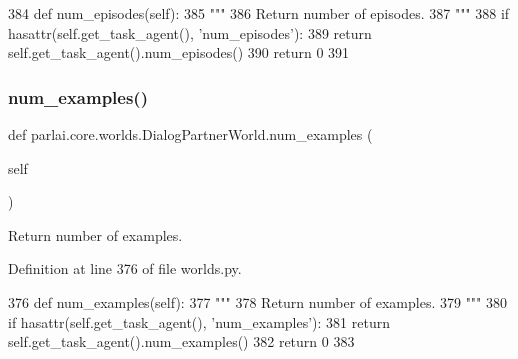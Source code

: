 \begin{DoxyCode}
384     \textcolor{keyword}{def }num\_episodes(self):
385         \textcolor{stringliteral}{"""}
386 \textcolor{stringliteral}{        Return number of episodes.}
387 \textcolor{stringliteral}{        """}
388         \textcolor{keywordflow}{if} hasattr(self.get\_task\_agent(), \textcolor{stringliteral}{'num\_episodes'}):
389             \textcolor{keywordflow}{return} self.get\_task\_agent().num\_episodes()
390         \textcolor{keywordflow}{return} 0
391 
\end{DoxyCode}
\mbox{\label{classparlai_1_1core_1_1worlds_1_1DialogPartnerWorld_aa925a37ec5968d137faf044279943e6a}} 
\subsubsection{\texorpdfstring{num\+\_\+examples()}{num\_examples()}}
{\footnotesize\ttfamily def parlai.\+core.\+worlds.\+Dialog\+Partner\+World.\+num\+\_\+examples (\begin{DoxyParamCaption}\item[{}]{self }\end{DoxyParamCaption})}

\begin{DoxyVerb}Return number of examples.
\end{DoxyVerb}
 

Definition at line 376 of file worlds.\+py.


\begin{DoxyCode}
376     \textcolor{keyword}{def }num\_examples(self):
377         \textcolor{stringliteral}{"""}
378 \textcolor{stringliteral}{        Return number of examples.}
379 \textcolor{stringliteral}{        """}
380         \textcolor{keywordflow}{if} hasattr(self.get\_task\_agent(), \textcolor{stringliteral}{'num\_examples'}):
381             \textcolor{keywordflow}{return} self.get\_task\_agent().num\_examples()
382         \textcolor{keywordflow}{return} 0
383 
\end{DoxyCode}
\mbox{\label{classparlai_1_1core_1_1worlds_1_1DialogPartnerWorld_a3ae10cae524d87d709e55bc7b2fd8265}} 
